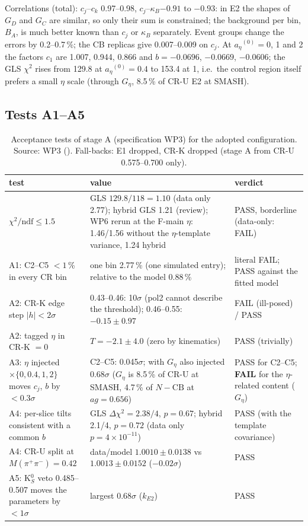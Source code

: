 \documentclass[11pt,a4paper]{article}
\newcommand{\Mpipi}{\ensuremath{M(\pi^{+}\pi^{-})}\xspace}
\newcommand{\code}[1]{\texttt{\detokenize{#1}}}
\newcommand{\aEta}{\ensuremath{a_\eta}\xspace}
\newcommand{\kB}{\ensuremath{\kappa_B}\xspace}
\newcommand{\kEtwo}{\ensuremath{k_{E2}}\xspace}
\newcommand{\Geta}{\ensuremath{G_\eta}\xspace}
\begin{document}
Correlations (total): $c_j$--$c_k$ 0.97--0.98, $c_j$--\kB $-0.91$ to $-0.93$: in E2 the shapes of $G_D$ and $G_C$ are similar, so only
their sum is constrained; the background per bin, $B_A$, is much better known than $c_j$ or \kB separately. Event groups change the
errors by 0.2--0.7\,\%; the CB replicas give 0.007--0.009 on $c_j$. At $\aEta^{(0)}=0$, 1 and 2 the factors $c_1$ are 1.007, 0.944, 0.866
and $b=-0.0696$, $-0.0669$, $-0.0606$; the GLS $\chi^2$ rises from 129.8 at $\aEta^{(0)}=0.4$ to 153.4 at 1, i.e.\ the control region
itself prefers a small $\eta$ scale (through \Geta, 8.5\,\% of CR-U E2 at SMASH).

\subsection{Tests A1--A5}
\begin{table}[H]
\centering
\caption{Acceptance tests of stage A (specification WP3) for the adopted configuration. Source: WP3 (\code{wp3_acceptance.txt}). Fall-backs: E1 dropped, CR-K dropped (stage A from CR-U 0.575--0.700 only).}
\label{tab:A15}
\small
\begin{tabular}{@{}p{5.4cm} p{6.6cm} p{3.4cm}@{}}
\toprule
test & value & verdict \\
\midrule
$\chi^2/\mathrm{ndf}\le1.5$ & GLS $129.8/118=1.10$ (data only 2.77); hybrid GLS 1.21 (review); WP6 rerun at the F-main $\eta$: 1.46/1.56 without the $\eta$-template variance, 1.24 hybrid & PASS, borderline (data-only: FAIL) \\
A1: C2--C5 $<1$\,\% in every CR bin & one bin 2.77\,\% (one simulated entry); relative to the model 0.88\,\% & literal FAIL; PASS against the fitted model \\
A2: CR-K edge step $|h|<2\sigma$ & 0.43--0.46: 10$\sigma$ (pol2 cannot describe the threshold); 0.46--0.55: $-0.15\pm0.97$ & FAIL (ill-posed) / PASS \\
A2: tagged $\eta$ in CR-K $=0$ & $T=-2.1\pm4.0$ (zero by kinematics) & PASS (trivially) \\
A3: $\eta$ injected $\times\{0,0.4,1,2\}$ moves $c_j$, $b$ by $<0.3\sigma$ & C2--C5: 0.045$\sigma$; with \Geta also injected 0.68$\sigma$ (\Geta is 8.5\,\% of CR-U at SMASH, 4.7\,\% of $N-\mathrm{CB}$ at $ag=0.656$) & PASS for C2--C5; \textbf{FAIL} for the $\eta$-related content (\Geta) \\
A4: per-slice tilts consistent with a common $b$ & GLS $\Delta\chi^2=2.38/4$, $p=0.67$; hybrid 2.1/4, $p=0.72$ (data only $p=4\times10^{-11}$) & PASS (with the template covariance) \\
A4: CR-U split at \Mpipi$=0.42$ & data/model $1.0010\pm0.0138$ vs $1.0013\pm0.0152$ ($-0.02\sigma$) & PASS \\
A5: K$^0_S$ veto 0.485--0.507 moves the parameters by $<1\sigma$ & largest 0.68$\sigma$ (\kEtwo) & PASS \\
\bottomrule
\end{tabular}
\end{table}
\end{document}

